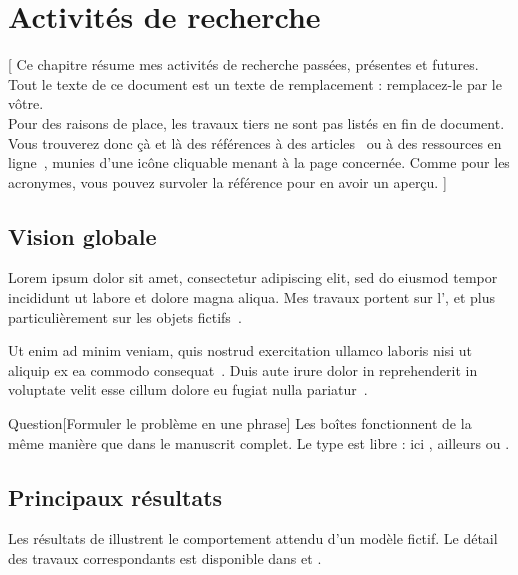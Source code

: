 \chapter[demand_research]{Activités de recherche}
 [
  Ce chapitre résume mes activités de recherche passées, présentes et futures. \\
  Tout le texte de ce document est un texte de remplacement : remplacez-le par le vôtre. \\
  Pour des raisons de place, les travaux tiers ne sont pas listés en fin de document. Vous trouverez donc çà et là des références à des articles~\cite{ipsum1998foundational} ou à des ressources en ligne~\cite{placeholder_www}, munies d'une icône cliquable menant à la page concernée. Comme pour les acronymes, vous pouvez survoler la référence pour en avoir un aperçu.
 ]

\section[demand_research_global]{Vision globale}

Lorem ipsum dolor sit amet, consectetur adipiscing elit, sed do eiusmod tempor incididunt ut labore et dolore magna aliqua.
Mes travaux portent sur l', et plus particulièrement sur les objets fictifs~\cite{ipsum1998foundational}.

Ut enim ad minim veniam, quis nostrud exercitation ullamco laboris nisi ut aliquip ex ea commodo consequat~\cite{lastname2021journal}.
Duis aute irure dolor in reprehenderit in voluptate velit esse cillum dolore eu fugiat nulla pariatur~\cite{amet2017seminal}.

\begin{boxenv}{Question}[Formuler le problème en une phrase]
    Les boîtes fonctionnent de la même manière que dans le manuscrit complet.
    Le type est libre : ici , ailleurs  ou .
\end{boxenv}

\section[demand_research_results]{Principaux résultats}

Les résultats de  illustrent le comportement attendu d'un modèle fictif.
Le détail des travaux correspondants est disponible dans \cite{lastname2022conference} et \cite{lastname2024journal}.

